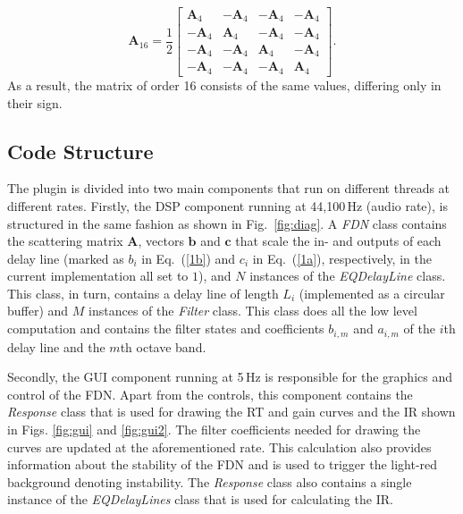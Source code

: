 \documentclass[twoside,a4paper]{article}
\begin{document}
\begin{equation}
\mathbf{A}_{16} = \frac{1}{2}
    \begin{bmatrix}
         \mathbf{A}_4& -\mathbf{A}_4& -\mathbf{A}_4 & -\mathbf{A}_4 \\
        -\mathbf{A}_4 & \mathbf{A}_4 & -\mathbf{A}_4& -\mathbf{A}_4\\
        -\mathbf{A}_4 & -\mathbf{A}_4 & \mathbf{A}_4 & -\mathbf{A}_4 \\
         -\mathbf{A}_4 & -\mathbf{A}_4 & -\mathbf{A}_4 & \mathbf{A}_4
    \end{bmatrix}.
    \label{eq:embed}
\end{equation}
As a result, the matrix of order 16 consists of the same values, differing only in their sign.


\subsection{Code Structure}\label{sec:codeStructure}
The plugin is divided into two main components that run on different threads at different rates. Firstly, the DSP component running at 44,100\,Hz (audio rate), is structured in the same fashion as shown in Fig.~\ref{fig:diag}. A \textit{FDN} class contains the scattering matrix $\textbf{A}$, vectors $\mathbf{b}$ and $\mathbf{c}$ that scale the in- and outputs of each delay line (marked as $b_i$ in Eq.~(\ref{1b}) and $c_i$ in Eq.~(\ref{1a}), respectively, in the current implementation all set to $1$), and $N$ instances of the \textit{EQDelayLine} class. This class, in turn, contains a delay line of length $L_i$ (implemented as a circular buffer) and $M$ instances of the \textit{Filter} class. This class does all the low level computation and contains the filter states and coefficients $b_{i,m}$ and $a_{i,m}$ of the $i$th delay line and the $m$th octave band.

Secondly, the GUI component running at 5\,Hz is responsible for the graphics and control of the FDN. Apart from the controls, this component contains the \textit{Response} class that is used for drawing the RT and gain curves and the IR shown in Figs. \ref{fig:gui} and \ref{fig:gui2}. The filter coefficients needed for drawing the curves are updated at the aforementioned rate. This calculation also provides information about the stability of the FDN and is used to trigger the light-red background denoting instability. The \textit{Response} class also contains a single instance of the \textit{EQDelayLines} class that is used for calculating the IR.
\end{document}
